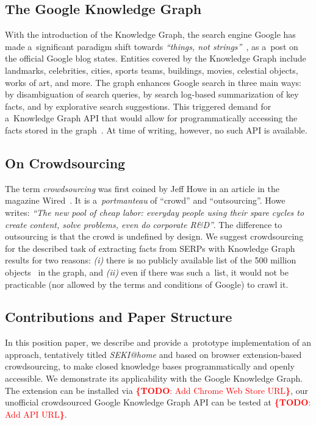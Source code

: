 \documentclass[runningheads,a4paper]{llncs}
\newcommand{\todo}[1]{\noindent\textcolor{red}{{\bf \{TODO}: #1{\bf \}}}}
\begin{document}
\subsection{The Google Knowledge Graph}
With the introduction of the Knowledge Graph, the search engine Google
has made a~significant paradigm shift towards \textit{``things, not strings''}~\cite{singhal2012},
as a~post on the official Google blog states.
Entities covered by the Knowledge Graph include landmarks, celebrities, cities, sports
teams, buildings, movies, celestial objects, works of art, and more.
The graph enhances Google search in three main ways:
by disambiguation of search queries,
by search log-based summarization of key facts,
and by explorative search suggestions.
This triggered demand for a~Knowledge Graph API that would allow for
programmatically accessing the facts stored in the graph~\cite{quora2012}.
At time of writing, however, no such API is available.

\subsection{On Crowdsourcing}
The term \emph{crowdsourcing} was first coined by Jeff Howe
in an article in the magazine Wired~\cite{howe2006}.
It is a~\textit{portmanteau} of ``crowd'' and ``outsourcing''.
Howe writes: \textit{``The new pool of cheap labor:
everyday people using their spare cycles to create content, solve problems,
even do corporate R\&D''}.
The difference to outsourcing is that the crowd is undefined by design.
We suggest crowdsourcing for the described task of extracting facts from
SERPs with Knowledge Graph results for two reasons:
\textit{(i)} there is no publicly available list
of the 500 million objects~\cite{singhal2012} in the graph, and
\textit{(ii)} even if there was such a~list,
it would not be practicable (nor allowed by the terms and conditions of Google)
to crawl it.

\subsection{Contributions and Paper Structure}
In this position paper, we describe and provide a~prototype implementation
of an approach, tentatively titled \emph{SEKI@home} and
based on browser extension-based crowdsourcing,
to make closed knowledge bases programmatically and openly accessible.
We demonstrate its applicability with the Google Knowledge Graph.
The extension can be installed via \todo{Add Chrome Web Store URL},
our unofficial crowdsourced Google Knowledge Graph API can be tested at
\todo{Add API URL}.
\end{document}
